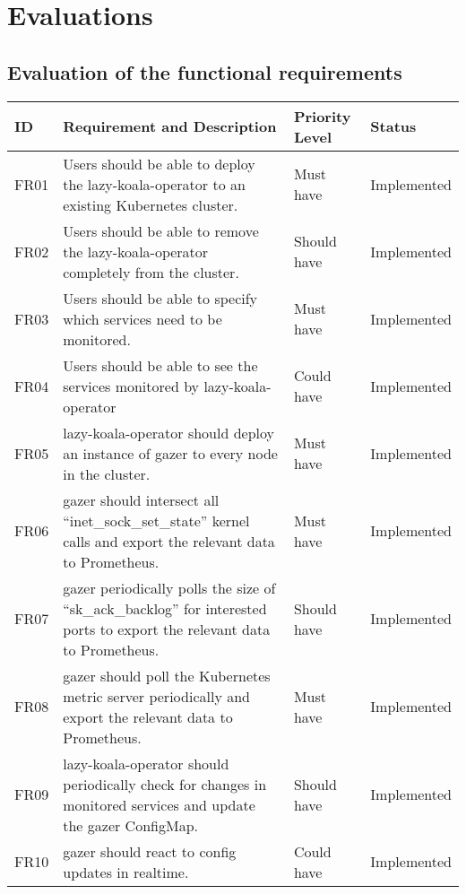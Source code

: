 \chapter{Evaluations}

\section{Evaluation of the functional requirements}\label{appendix:evaluation-functional-requirements}

\begin{longtable}{|p{13mm}|p{80mm}|p{26mm}|p{27mm}|}
    \hline
    \textbf{ID} & \textbf{Requirement and Description} & \textbf{Priority Level} & \textbf{Status} \\ \hline
    FR01 & Users should be able to deploy the \ac{lazy-koala-operator} to an existing Kubernetes cluster. & Must have & Implemented \\ \hline
    FR02 & Users should be able to remove the \ac{lazy-koala-operator} completely from the cluster. & Should have & Implemented \\ \hline
    FR03 & Users should be able to specify which services need to be monitored. & Must have & Implemented \\ \hline
    FR04 & Users should be able to see the services monitored by \ac{lazy-koala-operator} & Could have & Implemented \\ \hline
    FR05 & \ac{lazy-koala-operator} should deploy an instance of \ac{gazer} to every node in the cluster. & Must have & Implemented \\ \hline
    FR06 & \ac{gazer} should intersect all “inet\_sock\_set\_state” kernel calls and export the relevant data to Prometheus. & Must have & Implemented \\ \hline
    FR07 & \ac{gazer} periodically polls the size of “sk\_ack\_backlog” for interested ports to export the relevant data to Prometheus. & Should have & Implemented \\ \hline
    FR08 & \ac{gazer} should poll the Kubernetes metric server periodically and export the relevant data to Prometheus. & Must have & Implemented \\ \hline
    FR09 & \ac{lazy-koala-operator} should periodically check for changes in monitored services and update the \ac{gazer} ConfigMap. & Should have & Implemented \\ \hline
    FR10 & \ac{gazer} should react to config updates in realtime. & Could have & Implemented \\ \hline

\end{longtable}

